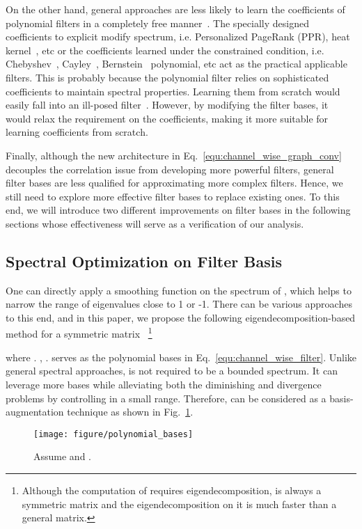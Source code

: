 \documentclass[nohyperref]{article}
\theoremstyle{plain}
\theoremstyle{definition}
\theoremstyle{remark}
\begin{document}
On the other hand, general approaches are less likely to learn the coefficients of polynomial filters in a completely free manner~\cite{klicpera2019diffusion,he2021bernnet}.
The specially designed coefficients to explicit modify spectrum, i.e. Personalized PageRank (PPR), heat kernel~\cite{klicpera2019diffusion}, etc or the coefficients learned under the constrained condition, i.e. Chebyshev~\cite{defferrard2016convolutional}, Cayley~\cite{8521593}, Bernstein~\cite{he2021bernnet} polynomial, etc act as the practical applicable filters.
This is probably because the polynomial filter relies on sophisticated coefficients to maintain spectral properties.
Learning them from scratch would easily fall into an ill-posed filter~\cite{he2021bernnet}.
However, by modifying the filter bases, it would relax the requirement on the coefficients, making it more suitable for learning coefficients from scratch.

Finally, although the new architecture in Eq.~\ref{equ:channel_wise_graph_conv} decouples the correlation issue from developing more powerful filters, general filter bases are less qualified for approximating more complex filters. Hence, we still need to explore more effective filter bases to replace existing ones. To this end, we will introduce two different improvements on filter bases in the following sections whose effectiveness will serve as a verification of our analysis.


\subsection{Spectral Optimization on Filter Basis}
\label{sec:basis_optim}

One can directly apply a smoothing function on the spectrum of , which helps to narrow the range of eigenvalues close to 1 or -1.
There can be various approaches to this end, and in this paper, we propose the following eigendecomposition-based method for a symmetric matrix ~\footnote{Although the computation of  requires eigendecomposition,  is always a symmetric matrix and the eigendecomposition on it is much faster than a general matrix.}

where .
, .
 serves as the polynomial bases in Eq.~\ref{equ:channel_wise_filter}.
Unlike general spectral approaches,  is not required to be a bounded spectrum.
It can leverage more bases while alleviating both the diminishing and divergence problems by controlling  in a small range.
Therefore,  can be considered as a basis-augmentation technique as shown in Fig.~\ref{fig:basis_optim}.
\begin{figure}[ht]
	\centering
	\texttt{[image: figure/polynomial\_bases]}
	\vspace{-5pt}
	\caption{Assume  and .}
	\label{fig:basis_optim}
	\vspace{-10pt}
\end{figure}
\end{document}
